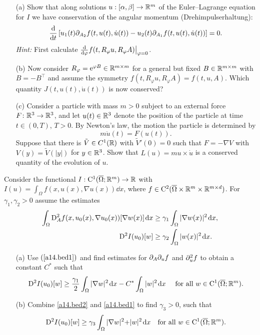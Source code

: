 \documentclass[12pt,a4paper]{article}
\begin{document}
\begin{itemize}
\item[(a)]  Show that along solutions  $u:[\alpha,\beta]\to{\mathbb R}^m$ of the
Euler--Lagrange equation for $I$ we have conservation of the 
angular momentum (Drehimpulserhaltung):
\[
\frac{{\mathrm d} }{{\mathrm d} t} \left[ u_1(t)\partial_{A_2}f(t,u(t),\dot{u}(t)) - 
u_2(t)\partial_{A_1}f(t,u(t),\dot{u}(t))\right]= 0.
\]
\emph{Hint:} First calculate $\frac{{\mathrm d}}{{\mathrm d} \varphi} 
f(t,R_\varphi{}u,R_\varphi{}A)\big|_{\varphi=0}$.


\item[(b)] Now consider $R_\varphi=\mathrm{e}^{\varphi{}B}\in{\mathbb R}^{m\times{}m}$ for a
  general but fixed $B\in{\mathbb R}^{m\times{}m}$ with $B=-B^\top$ and assume the
  symmetry 
$f(t,R_\varphi{}u,R_\varphi{}A)=f(t,u,A)$. Which quantity  $J(t,u(t),\dot{u}(t))$
is now conserved?

\item[(c)]
Consider a particle with mass $m>0$ subject to an external force $F\colon{\mathbb R}^3\to{\mathbb R}^3$,
and let $u(t)\in{\mathbb R}^3$ denote the position of the particle at time $t\in(0,T)$, $T>0$.
By Newton's law,
the motion the particle is determined by
\[
m \ddot u (t) = F(u(t)).
\]
Suppose that there is $\tilde V\in C^1({\mathbb R})$ with $\tilde V'(0)=0$ such that 
$F=-\nabla V$
with $V(y)=\tilde V(|y|)$ for $y\in{\mathbb R}^3$.
Show that $L(u)=m u\times \dot u$ is a conserved quantity
of the evolution of $u$.



\end{itemize}

Consider the functional $I:{\mathrm C}^1(\overline\Omega;{\mathbb R}^m) \to {\mathbb R}$ with
$I(u) = \int_\Omega f(x,u(x),\nabla u(x))\dd x$, where $f\in
{\mathrm C}^2(\overline\Omega\times{\mathbb R}^m\times {\mathbb R}^{m\times d})$. 
For $\gamma_1, \gamma_2 > 0$ assume the estimates
\begin{align}
  \label{a14.bed1}
   \int_\Omega {\mathrm D}_A^2f(x,u_0(x),\nabla u_0(x)) [\nabla w(x)]\;\!\mathrm{d}
   x & \geq \gamma_1\int_\Omega |\nabla w(x)|^2\;\!\mathrm{d} x ,\\ 
  \label{a14.bed2}
  {\mathrm D}^2I(u_0)[w] & \geq \gamma_2 \int_\Omega |w(x)|^2 \;\!\mathrm{d} x.
\end{align}
\begin{itemize}
\item[(a)] Use $(\ref{a14.bed1})$ and find estimates for  $\partial_A\partial_uf$
and $\partial^2_u f$ to obtain a constant $C^*$ such that 
\[
{\mathrm D}^2 I(u_0)[w] \geq \frac{\gamma_1}{2} \int_\Omega |\nabla w|^2\;\!\mathrm{d} x 
- C^* \int_\Omega |w|^2 \;\!\mathrm{d} x \quad\text{ for all }w\in {\mathrm C}^1(\overline\Omega;{\mathbb R}^m).
\]
\item[(b)] Combine \eqref{a14.bed2} and \eqref{a14.bed1} to find  $\gamma_3 >
0$, such that 
\[
{\mathrm D}^2I(u_0)[w] \geq \gamma_3\int_\Omega |\nabla w|^2
{+} |w|^2 \;\!\mathrm{d} x \ \ \text{   for all } w\in {\mathrm C}^1(\overline{\Omega};{\mathbb R}^m).
\]
\end{itemize}
\end{document}
